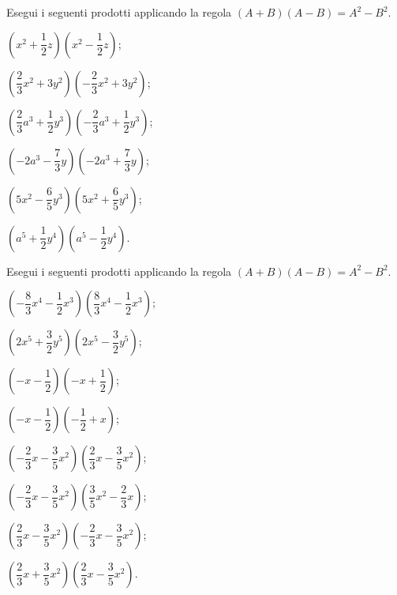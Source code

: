 \begin{esercizio}
 \label{ese:11.19}
Esegui i seguenti prodotti applicando la regola
$\left(A+B\right)\left(A-B\right)=A^{2}-B^{2}$.
 \begin{multicols}{2}
\begin{enumeratea}
 \item $\left(x^{2}+\dfrac{1}{2}z\right)\left(x^{2}-\dfrac{1}{2}z\right)$;
 \item $\left(\dfrac{2}{3}x^{2}+3y^{2}\right)\left(-{\dfrac{2}{3}}x^{2}+3y^{2}\right)$;
 \item $\left(\dfrac{2}{3}a^{3}+\dfrac{1}{2}y^{3}\right)\left(-{\dfrac{2}{3}}a^{3}+\dfrac{1}{2}y^{3}\right)$;
 \item $\left(-2a^{3}-\dfrac{7}{3}y\right)\left(-2a^{3}+\dfrac{7}{3}y\right)$;
 \item $\left(5x^{2}-\dfrac{6}{5}y^{3}\right)\left(5x^{2}+\dfrac{6}{5}y^{3}\right)$;
 \item $\left(a^{5}+\dfrac{1}{2}y^{4}\right)\left(a^{5}-\dfrac{1}{2}y^{4}\right)$.
\end{enumeratea}
\end{multicols}
\end{esercizio}

\begin{esercizio}
 \label{ese:11.20}
Esegui i seguenti prodotti applicando la regola
$\left(A+B\right)\left(A-B\right)=A^{2}-B^{2}$.
 \begin{multicols}{2}
\begin{enumeratea}
 \item $\left(-{\dfrac{8}{3}}x^{4}-\dfrac{1}{2}x^{3}\right)\left(\dfrac{8}{3}x^{4}-\dfrac{1}{2}x^{3}\right)$;
 \item $\left(2x^{5}+\dfrac{3}{2}y^{5}\right)\left(2x^{5}-\dfrac{3}{2}y^{5}\right)$;
 \item $\left(-x-\dfrac{1}{2}\right)\left(-x+\dfrac{1}{2}\right)$;
 \item $\left(-x-\dfrac{1}{2}\right)\left(-{\dfrac{1}{2}}+x\right)$;
 \item $\left(-{\dfrac{2}{3}x-\dfrac{3}{5}x^{2}}\right)\left(\dfrac{2}{3}x-\dfrac{3}{5}x^{2}\right)$;
 \item $\left(-{\dfrac{2}{3}x-\dfrac{3}{5}x^{2}}\right)\left(\dfrac{3}{5}x^{2}-\dfrac{2}{3}x\right)$;
 \item $\left(\dfrac{2}{3}x-\dfrac{3}{5}x^{2}\right)\left(-{\dfrac{2}{3}x-\dfrac{3}{5}x^{2}}\right)$;
 \item $\left(\dfrac{2}{3}x+\dfrac{3}{5}x^{2}\right)\left(\dfrac{2}{3}x-\dfrac{3}{5}x^{2}\right)$.
\end{enumeratea}
\end{multicols}
\end{esercizio}

